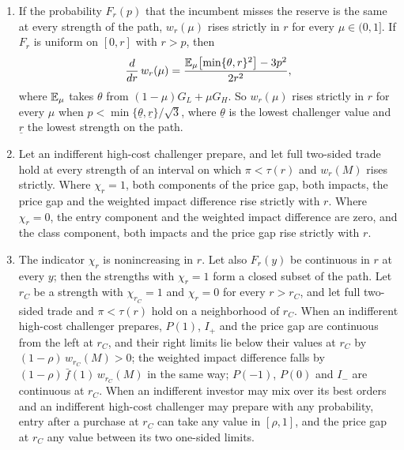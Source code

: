 \begin{proposition}
\begin{enumerate}[label=(\roman*),leftmargin=2em]
\begin{enumerate}[label=(\alph*),leftmargin=2em]
\item If the probability \(F_r(p)\) that the incumbent misses the reserve is the same at every strength of the path,
\(w_r(\mu)\) rises strictly in \(r\) for every \(\mu\in(0,1]\). If \(F_r\) is uniform on \([0,r]\) with \(r>p\), then
\[
\frac{d}{dr}\,w_r(\mu)=\frac{\mathbb{E}_\mu\bigl[\min\{\theta,r\}^2\bigr]-3p^2}{2r^2},
\]
where \(\mathbb{E}_\mu\) takes \(\theta\) from \((1-\mu)G_L+\mu G_H\). So \(w_r(\mu)\) rises strictly in \(r\) for every
\(\mu\) when \(p<\min\{\underline\theta,\underline r\}/\sqrt3\), where \(\underline\theta\) is the lowest challenger
value and \(\underline r\) the lowest strength on the path.
\item Let an indifferent high-cost challenger prepare, and let full two-sided trade hold at every strength of an
interval on which \(\pi<\tau(r)\) and \(w_r(M)\) rises strictly. Where \(\chi_r=1\), both components of the price gap,
both impacts, the price gap and the weighted impact difference rise strictly with \(r\). Where \(\chi_r=0\), the
entry component and the weighted impact difference are zero, and the class component, both impacts and the price
gap rise strictly with \(r\).
\item The indicator \(\chi_r\) is nonincreasing in \(r\). Let also \(F_r(y)\) be continuous in \(r\) at every \(y\);
then the strengths with \(\chi_r=1\) form a closed subset of the path. Let \(r_C\) be a strength with
\(\chi_{r_C}=1\) and \(\chi_r=0\) for every \(r>r_C\), and let full two-sided trade and \(\pi<\tau(r)\) hold on a
neighborhood of \(r_C\). When an indifferent
high-cost challenger prepares, \(P(1)\), \(I_+\) and the price gap are continuous from the left at \(r_C\), and their
right limits lie below their values at \(r_C\) by \((1-\rho)\,w_{r_C}(M)>0\); the weighted impact difference falls
by \((1-\rho)\,\bar f(1)\,w_{r_C}(M)\) in the same way; \(P(-1)\), \(P(0)\) and \(I_-\) are continuous at \(r_C\).
When an indifferent investor may mix over its best orders and an indifferent high-cost challenger may prepare with
any probability, entry after a purchase at \(r_C\) can take
any value in \([\rho,1]\), and the price gap at \(r_C\) any value between its two one-sided limits.
\end{enumerate}
\end{enumerate}
\end{proposition}

